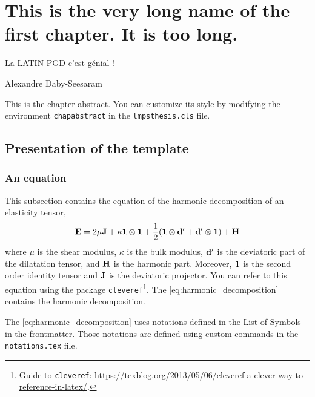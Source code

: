 \chapter[Short name of chapter]{This is the very long name of the first chapter. It is too long.}

{\color{lmpsblue} \epigraph{La LATIN-PGD c'est génial !}{Alexandre Daby-Seesaram}}

\begin{chapabstract}
    This is the chapter abstract. You can customize its style by modifying the environment \texttt{chapabstract} in the \texttt{lmpsthesis.cls} file.
    \lipsum[1]
\end{chapabstract}

\minitoc

\section{Presentation of the template}%
\label{sec:presentation_of_the_template}

\subsection{An equation}%
\label{sub:an_equation}

This subsection contains the equation of the harmonic decomposition of an elasticity tensor,
\begin{equation}\label{eq:harmonic_decomposition}
    \ela =
        2 \mu \J +
        \kappa \id{2} \otimes \id{2} +
        \frac{1}{2} (\id{2} \otimes \dev{\dil} + \dev{\dil} \otimes \id{2}) +
        \har
\end{equation}
where
    $\mu$ is the shear modulus,
    $\kappa$ is the bulk modulus,
    $\mathbf{d}'$ is the deviatoric part of the dilatation tensor, and
    $\mathbf{H}$ is the harmonic part.
Moreover, $\id{2}$ is the second order identity tensor and $\mathbf{J}$ is the deviatoric projector.
You can refer to this equation using the package \texttt{cleveref}\footnote{Guide to \texttt{cleveref}: \url{https://texblog.org/2013/05/06/cleveref-a-clever-way-to-reference-in-latex/}.}.
The \cref{eq:harmonic_decomposition} contains the harmonic decomposition.
\begin{remark}
    The \cref{eq:harmonic_decomposition} uses notations defined in the List of Symbols in the frontmatter.
    Those notations are defined using custom commands in the \texttt{notations.tex} file.
\end{remark}

